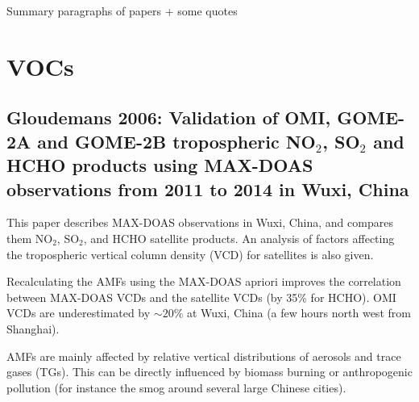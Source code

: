 \documentclass[11pt]{article} %
\begin{document}

\begin{titlepage}
\begin{center}
Summary paragraphs of papers + some quotes

\end{center}
\end{titlepage}

\tableofcontents %
\listoffigures %
\listoftables %


\section{VOCs}
  \subsection{Gloudemans 2006: Validation of OMI, GOME-2A and GOME-2B tropospheric NO$_2$, SO$_2$ and HCHO products using MAX-DOAS observations from 2011 to 2014 in Wuxi, China}
    \citet{Gloudemans2006}
    
    This paper describes MAX-DOAS observations in Wuxi, China, and compares them NO$_2$, SO$_2$, and HCHO satellite products.
    An analysis of factors affecting the tropospheric vertical column density (VCD) for satellites is also given.
    
    Recalculating the AMFs using the MAX-DOAS apriori improves the correlation between MAX-DOAS VCDs and the satellite VCDs (by 35\% for HCHO). 
    OMI VCDs are underestimated by $\sim20$\% at Wuxi, China (a few hours north west from Shanghai).
    
    AMFs are mainly affected by relative vertical distributions of aerosols and trace gases (TGs).
    This can be directly influenced by biomass burning or anthropogenic pollution (for instance the smog around several large Chinese cities).
    
\end{document}
